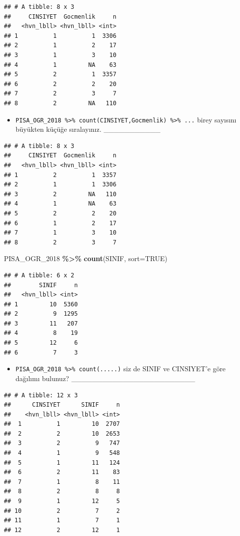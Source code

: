 \documentclass[
  oneside]{book}
\newenvironment{Shaded}{\begin{snugshade}}{\end{snugshade}}
\newcommand{\AttributeTok}[1]{\textcolor[rgb]{0.13,0.29,0.53}{#1}}
\newcommand{\ConstantTok}[1]{\textcolor[rgb]{0.56,0.35,0.01}{#1}}
\newcommand{\FunctionTok}[1]{\textcolor[rgb]{0.13,0.29,0.53}{\textbf{#1}}}
\newcommand{\NormalTok}[1]{#1}
\newcommand{\SpecialCharTok}[1]{\textcolor[rgb]{0.81,0.36,0.00}{\textbf{#1}}}
\providecommand{\tightlist}{%
  \setlength{\itemsep}{0pt}\setlength{\parskip}{0pt}}
\begin{document}
\begin{verbatim}
## # A tibble: 8 x 3
##     CINSIYET  Gocmenlik     n
##   <hvn_lbll> <hvn_lbll> <int>
## 1          1          1  3306
## 2          1          2    17
## 3          1          3    10
## 4          1         NA    63
## 5          2          1  3357
## 6          2          2    20
## 7          2          3     7
## 8          2         NA   110
\end{verbatim}

\begin{itemize}
\tightlist
\item
  \texttt{PISA\_OGR\_2018\ \%\textgreater{}\%\ count(CINSIYET,Gocmenlik)\ \%\textgreater{}\%\ ...} birey sayısını büyükten küçüğe sıralayınız.
  \_\_\_\_\_\_\_\_\_\_\_
\end{itemize}

\begin{verbatim}
## # A tibble: 8 x 3
##     CINSIYET  Gocmenlik     n
##   <hvn_lbll> <hvn_lbll> <int>
## 1          2          1  3357
## 2          1          1  3306
## 3          2         NA   110
## 4          1         NA    63
## 5          2          2    20
## 6          1          2    17
## 7          1          3    10
## 8          2          3     7
\end{verbatim}

\begin{Shaded}
\begin{Highlighting}[]
\NormalTok{PISA\_OGR\_2018 }\SpecialCharTok{\%\textgreater{}\%} \FunctionTok{count}\NormalTok{(SINIF, }\AttributeTok{sort=}\ConstantTok{TRUE}\NormalTok{)}
\end{Highlighting}
\end{Shaded}

\begin{verbatim}
## # A tibble: 6 x 2
##        SINIF     n
##   <hvn_lbll> <int>
## 1         10  5360
## 2          9  1295
## 3         11   207
## 4          8    19
## 5         12     6
## 6          7     3
\end{verbatim}

\begin{itemize}
\tightlist
\item
  \texttt{PISA\_OGR\_2018\ \%\textgreater{}\%\ count(.....)} siz de SINIF ve CINSIYET'e göre dağılımı bulunuz? \_\_\_\_\_\_\_\_\_\_\_\_\_\_\_\_\_\_\_\_\_\_\_\_
\end{itemize}

\begin{verbatim}
## # A tibble: 12 x 3
##      CINSIYET      SINIF     n
##    <hvn_lbll> <hvn_lbll> <int>
##  1          1         10  2707
##  2          2         10  2653
##  3          2          9   747
##  4          1          9   548
##  5          1         11   124
##  6          2         11    83
##  7          1          8    11
##  8          2          8     8
##  9          1         12     5
## 10          2          7     2
## 11          1          7     1
## 12          2         12     1
\end{verbatim}
\end{document}
